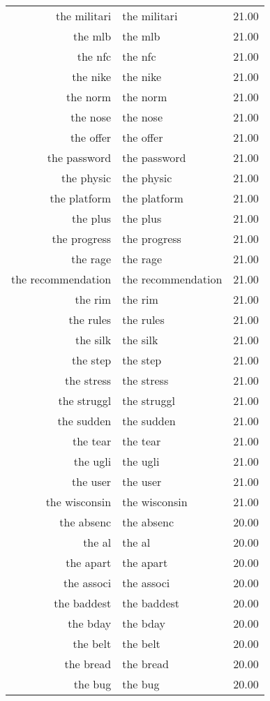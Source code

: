 \begin{table}[ht]
\begin{tabular}{rlr}
  the militari & the militari & 21.00 \\ 
  the mlb & the mlb & 21.00 \\ 
  the nfc & the nfc & 21.00 \\ 
  the nike & the nike & 21.00 \\ 
  the norm & the norm & 21.00 \\ 
  the nose & the nose & 21.00 \\ 
  the offer & the offer & 21.00 \\ 
  the password & the password & 21.00 \\ 
  the physic & the physic & 21.00 \\ 
  the platform & the platform & 21.00 \\ 
  the plus & the plus & 21.00 \\ 
  the progress & the progress & 21.00 \\ 
  the rage & the rage & 21.00 \\ 
  the recommendation & the recommendation & 21.00 \\ 
  the rim & the rim & 21.00 \\ 
  the rules & the rules & 21.00 \\ 
  the silk & the silk & 21.00 \\ 
  the step & the step & 21.00 \\ 
  the stress & the stress & 21.00 \\ 
  the struggl & the struggl & 21.00 \\ 
  the sudden & the sudden & 21.00 \\ 
  the tear & the tear & 21.00 \\ 
  the ugli & the ugli & 21.00 \\ 
  the user & the user & 21.00 \\ 
  the wisconsin & the wisconsin & 21.00 \\ 
  the absenc & the absenc & 20.00 \\ 
  the al & the al & 20.00 \\ 
  the apart & the apart & 20.00 \\ 
  the associ & the associ & 20.00 \\ 
  the baddest & the baddest & 20.00 \\ 
  the bday & the bday & 20.00 \\ 
  the belt & the belt & 20.00 \\ 
  the bread & the bread & 20.00 \\ 
  the bug & the bug & 20.00 \\ 

\end{tabular}
\end{table}
